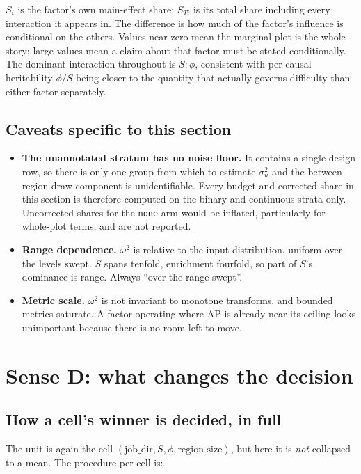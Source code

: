 \documentclass[11pt,a4paper]{article}
\begin{document}
$S_i$ is the factor's own main-effect share; $S_{Ti}$ is its total share
including every interaction it appears in. The difference is how much of the
factor's influence is conditional on the others. Values near zero mean the
marginal plot is the whole story; large values mean a claim about that factor
must be stated conditionally. The dominant interaction throughout is
$S{:}\phi$, consistent with per-causal heritability $\phi/S$ being closer to
the quantity that actually governs difficulty than either factor separately.

\subsection{Caveats specific to this section}

\begin{itemize}
\item \textbf{The unannotated stratum has no noise floor.} It contains a single
design row, so there is only one group from which to estimate $\sigma^2_u$ and
the between-region-draw component is unidentifiable. Every budget and corrected
share in this section is therefore computed on the binary and continuous strata
only. Uncorrected shares for the \texttt{none} arm would be inflated,
particularly for whole-plot terms, and are not reported.
\item \textbf{Range dependence.} $\omega^2$ is relative to the input
distribution, uniform over the levels swept. $S$ spans tenfold, enrichment
fourfold, so part of $S$'s dominance is range. Always ``over the range swept''.
\item \textbf{Metric scale.} $\omega^2$ is not invariant to monotone transforms,
and bounded metrics saturate. A factor operating where AP is already near its
ceiling looks unimportant because there is no room left to move.
\end{itemize}

\section{Sense D: what changes the decision}\label{sec:sensed}

\subsection{How a cell's winner is decided, in full}\label{sec:dhow}

The unit is again the cell $(\text{job\_dir},S,\phi,\text{region size})$, but
here it is \emph{not} collapsed to a mean. The procedure per cell is:
\end{document}

